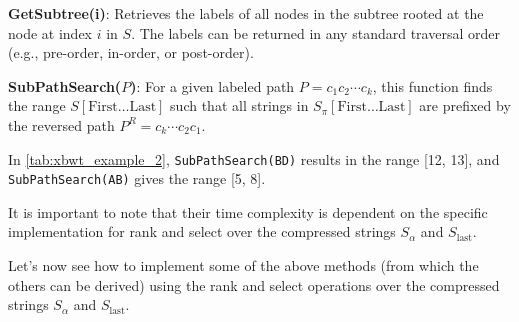 \textbf{GetSubtree(i)}: Retrieves the labels of all nodes in the subtree rooted at the node at index $i$ in $S$. The labels can be returned in any standard traversal order (e.g., pre-order, in-order, or post-order).

\textbf{SubPathSearch($P$)}: For a given labeled path $P = c_1c_2 \cdots c_k$, this function finds the range $S[\text{First} \dots \text{Last}]$ such that all strings in $S_{\pi}[\text{First} \dots \text{Last}]$ are prefixed by the reversed path $P^R = c_k \cdots c_2c_1$.
\begin{example}
    In \cref{tab:xbwt_example_2}, \texttt{SubPathSearch(BD)} results in the range [12, 13], and \\ \texttt{SubPathSearch(AB)} gives the range [5, 8].
\end{example}

It is important to note that their time complexity is dependent on the specific implementation for rank and select over the compressed strings $S_{\alpha}$ and $S_{\text{last}}$. 

Let's now see how to implement some of the above methods (from which the others can be derived) using the rank and select operations over the compressed strings $S_{\alpha}$ and $S_{\text{last}}$.

